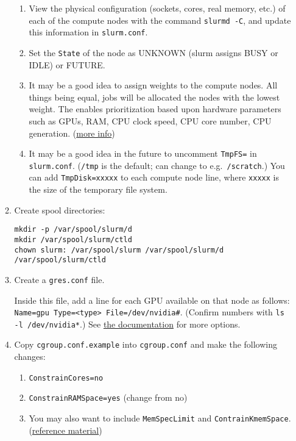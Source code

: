 \begin{enumerate}
\begin{enumerate}
\begin{enumerate}
		\item View the physical configuration (sockets, cores, real memory, etc.) of each of the compute nodes with the command \texttt{slurmd -C}, and update this information in \texttt{slurm.conf}.

		\item Set the \texttt{State} of the node as UNKNOWN (slurm assigns BUSY or IDLE) or FUTURE.

		\item It may be a good idea to assign weights to the compute nodes. All things being equal, jobs will be allocated the nodes with the lowest weight. The enables prioritization based upon hardware parameters such as GPUs, RAM, CPU clock speed, CPU core number, CPU generation. (\href{https://wiki.fysik.dtu.dk/niflheim/Slurm_configuration#node-weight}{more info})

		\item It may be a good idea in the future to uncomment \texttt{TmpFS=} in \texttt{slurm.conf}. (\texttt{/tmp} is the default; can change to e.g.\ \texttt{/scratch}.) You can add \texttt{TmpDisk=xxxxx} to each compute node line, where \texttt{xxxxx} is the size of the temporary file system.

		\end{enumerate}

	\item Create spool directories:
	
	\texttt{mkdir -p /var/spool/slurm/d} \\
	\texttt{mkdir /var/spool/slurm/ctld} \\
	\texttt{chown slurm: /var/spool/slurm /var/spool/slurm/d /var/spool/slurm/ctld}
	
	\item Create a \texttt{gres.conf} file. 

	Inside this file, add a line for each GPU available on that node as follows: \texttt{Name=gpu Type=<type> File=/dev/nvidia\#}. (Confirm numbers with \texttt{ls -l /dev/nvidia*}.) See \href{https://slurm.schedmd.com/gres.conf.html}{the documentation} for more options.

	\item Copy \texttt{cgroup.conf.example} into \texttt{cgroup.conf} and make the following changes:

		\begin{enumerate}
		\item \texttt{ConstrainCores=no}
		\item \texttt{ConstrainRAMSpace=yes} (change from no)
		\item You may also want to include \texttt{MemSpecLimit} and \texttt{ContrainKmemSpace}.  (\href{https://www.mankier.com/5/cgroup.conf}{reference material})
		\end{enumerate}
		

\end{enumerate}
\end{enumerate}
